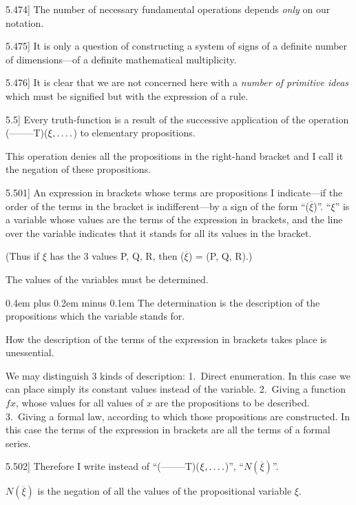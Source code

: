 \documentclass[12pt,oneside]{book}[2007/10/19]
\newcommand{\PropositionE}[2]{%
  \item[\phantomsection\label{PropE:#1}\PropGRef{#1}] #2%
}
\newcommand{\PropGRef}[1]{\hyperref[PropG:#1]{#1}}
\newcommand{\fourdots}{\mathinner{\ldotp\ldotp\ldotp\ldotp}}
\newcommand{\stretchyspace}{\spaceskip0.4em plus 0.2em minus 0.1em}
\newcommand{\AllowBreak}{\discretionary{}{}{}}
\begin{document}
\begin{propositions}
\PropositionE{5.474}
{The number of necessary fundamental operations
depends \emph{only} on our notation.}


\PropositionE{5.475}
{It is only a question of constructing a system
of signs of a definite number of di\-men\-sions---of
a definite mathematical multiplicity.}


\PropositionE{5.476}
{It is clear that we are not concerned here with
a \emph{number of primitive ideas} which must be signified
but with the expression of a rule.}


\PropositionE{5.5}
{Every truth-function is a result of the successive
application of the operation \mbox{(--\;--\;--\;--\;--T)}\AllowBreak($\xi, \fourdots$) to
elementary propositions.

This operation denies all the propositions in
the right-hand bracket and I call it the negation
of these propositions.}


\PropositionE{5.501}
{An expression in brackets whose terms are
propositions I in\-di\-cate---if the order of the terms
in the bracket is indifferent---by a sign of the form
``($\overline{\xi}$)''. ``$\xi$'' is a variable whose values are the
terms of the expression in brackets, and the line
over the variable indicates that it stands for all
its values in the bracket.

(Thus if $\xi$ has the 3 values P, Q, R, then
($\overline{\xi}$) = (P, Q, R).)

The values of the variables must be determined.

{\stretchyspace
The determination is the description of the propositions
which the variable stands for.}

How the description of the terms of the expression
in brackets takes place is unessential.

We may distinguish 3 kinds of description:
1.~Direct enumeration. In this case we can place
simply its constant values instead of the variable.
2.~Giving a function $fx$, whose values for all
values of $x$ are the propositions to be described.
3.~Giving a formal law, according to which those
propositions are constructed. In this case the
terms of the expression in brackets are all the
terms of a formal series.}


\PropositionE{5.502}
{Therefore I write instead of \mbox{``(--\;--\;--\;--\;--T)}\AllowBreak($\xi, \fourdots$)'',
``$N(\overline{\xi})$''.

$N(\overline{\xi})$ is the negation of all the values of the
propositional variable $\xi$.}



\end{propositions}
\end{document}
